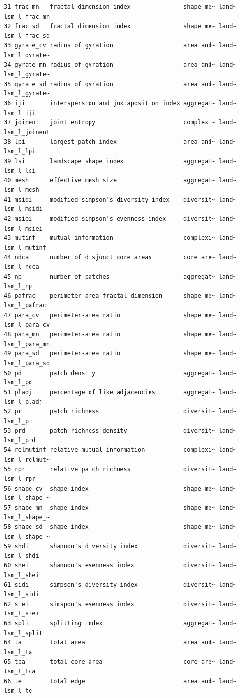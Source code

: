 \documentclass[
  letterpaper,
  DIV=11,
  numbers=noendperiod]{scrartcl}
\begin{document}
\begin{verbatim}
31 frac_mn   fractal dimension index               shape me~ land~ lsm_l_frac_mn
32 frac_sd   fractal dimension index               shape me~ land~ lsm_l_frac_sd
33 gyrate_cv radius of gyration                    area and~ land~ lsm_l_gyrate~
34 gyrate_mn radius of gyration                    area and~ land~ lsm_l_gyrate~
35 gyrate_sd radius of gyration                    area and~ land~ lsm_l_gyrate~
36 iji       interspersion and juxtaposition index aggregat~ land~ lsm_l_iji    
37 joinent   joint entropy                         complexi~ land~ lsm_l_joinent
38 lpi       largest patch index                   area and~ land~ lsm_l_lpi    
39 lsi       landscape shape index                 aggregat~ land~ lsm_l_lsi    
40 mesh      effective mesh size                   aggregat~ land~ lsm_l_mesh   
41 msidi     modified simpson's diversity index    diversit~ land~ lsm_l_msidi  
42 msiei     modified simpson's evenness index     diversit~ land~ lsm_l_msiei  
43 mutinf    mutual information                    complexi~ land~ lsm_l_mutinf 
44 ndca      number of disjunct core areas         core are~ land~ lsm_l_ndca   
45 np        number of patches                     aggregat~ land~ lsm_l_np     
46 pafrac    perimeter-area fractal dimension      shape me~ land~ lsm_l_pafrac 
47 para_cv   perimeter-area ratio                  shape me~ land~ lsm_l_para_cv
48 para_mn   perimeter-area ratio                  shape me~ land~ lsm_l_para_mn
49 para_sd   perimeter-area ratio                  shape me~ land~ lsm_l_para_sd
50 pd        patch density                         aggregat~ land~ lsm_l_pd     
51 pladj     percentage of like adjacencies        aggregat~ land~ lsm_l_pladj  
52 pr        patch richness                        diversit~ land~ lsm_l_pr     
53 prd       patch richness density                diversit~ land~ lsm_l_prd    
54 relmutinf relative mutual information           complexi~ land~ lsm_l_relmut~
55 rpr       relative patch richness               diversit~ land~ lsm_l_rpr    
56 shape_cv  shape index                           shape me~ land~ lsm_l_shape_~
57 shape_mn  shape index                           shape me~ land~ lsm_l_shape_~
58 shape_sd  shape index                           shape me~ land~ lsm_l_shape_~
59 shdi      shannon's diversity index             diversit~ land~ lsm_l_shdi   
60 shei      shannon's evenness index              diversit~ land~ lsm_l_shei   
61 sidi      simpson's diversity index             diversit~ land~ lsm_l_sidi   
62 siei      simspon's evenness index              diversit~ land~ lsm_l_siei   
63 split     splitting index                       aggregat~ land~ lsm_l_split  
64 ta        total area                            area and~ land~ lsm_l_ta     
65 tca       total core area                       core are~ land~ lsm_l_tca    
66 te        total edge                            area and~ land~ lsm_l_te     
\end{verbatim}
\end{document}
